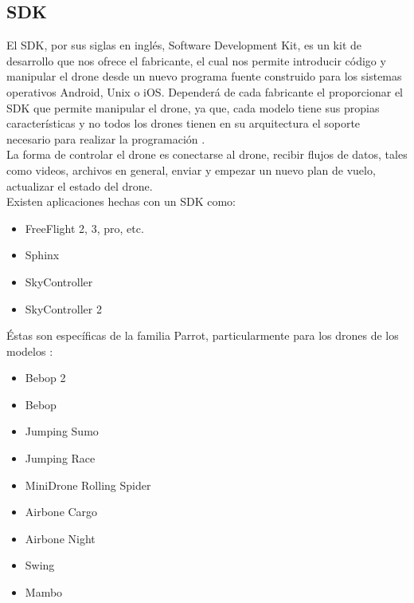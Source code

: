 %
\subsection{SDK}
El SDK, por sus siglas en inglés, Software Development Kit, es un kit de 
desarrollo que nos ofrece el fabricante, el cual nos permite introducir código y 
manipular el drone desde un nuevo programa fuente construido para los sistemas 
operativos Android, Unix o iOS. Dependerá de cada fabricante el proporcionar el 
SDK que permite manipular el drone, ya que, cada modelo tiene sus propias 
características y no todos los drones tienen en su arquitectura el soporte 
necesario para realizar la programación \cite{sdk_program_drone}. \\
La forma de controlar el drone es conectarse al drone, recibir flujos de datos, 
tales como videos, archivos en general, enviar y empezar un nuevo plan de vuelo, 
actualizar el estado del drone. \\

Existen aplicaciones hechas con un SDK como:
\begin{itemize}
	\item FreeFlight 2, 3, pro, etc. 
	\item Sphinx
	\item SkyController
	\item SkyController 2
\end{itemize}

Éstas son específicas de la familia Parrot, particularmente para los drones de 
los modelos \cite{sdk_program_drone}:

\begin{itemize}
	\item Bebop 2
	\item Bebop
	\item Jumping Sumo
	\item Jumping Race
	\item MiniDrone Rolling Spider
	\item Airbone Cargo
	\item Airbone Night
	\item Swing 
	\item Mambo
\end{itemize}

